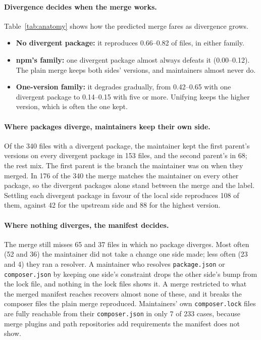 \documentclass[11pt]{article}
\newcommand{\code}[1]{\texttt{#1}}
\begin{document}
\paragraph{Divergence decides when the merge works.}
Table~\ref{tab:anatomy} shows how the predicted merge fares as divergence grows.
\begin{itemize}
  \item \textbf{No divergent package:} it reproduces 0.66--0.82 of files, in either family.
  \item \textbf{npm's family:} one divergent package almost always defeats it (0.00--0.12). The
  plain merge keeps both sides' versions, and maintainers almost never do.
  \item \textbf{One-version family:} it degrades gradually, from 0.42--0.65 with one divergent
  package to 0.14--0.15 with five or more. Unifying keeps the higher version, which is often the
  one kept.
\end{itemize}

\paragraph{Where packages diverge, maintainers keep their own side.}
Of the 340 files with a divergent package, the maintainer kept the first parent's versions on
every divergent package in 153 files, and the second parent's in 68; the rest mix. The first
parent is the branch the maintainer was on when they merged. In 176 of the 340 the merge matches
the maintainer on every other package, so the divergent packages alone stand between the merge
and the label. Settling each divergent package in favour of the local side reproduces 108 of
them, against 42 for the upstream side and 88 for the highest version.

\paragraph{Where nothing diverges, the manifest decides.}
The merge still misses 65 and 37 files in which no package diverges. Most often (52 and 36) the
maintainer did not take a change one side made; less often (23 and 4) they ran a resolver. A
maintainer who resolves \code{package.json} or \code{composer.json} by keeping one side's
constraint drops the other side's bump from the lock file, and nothing in the lock files shows
it. A merge restricted to what the merged manifest reaches recovers almost none of these, and it
breaks the composer files the plain merge reproduced. Maintainers' own \code{composer.lock}
files are fully reachable from their \code{composer.json} in only 7 of 233 cases, because merge
plugins and path repositories add requirements the manifest does not show.
\end{document}
